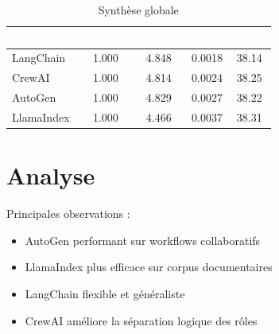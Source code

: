 \documentclass[12pt,a4paper]{article}
\begin{document}
\begin{table}[H]

\centering

\small

\begin{tabular}{lcccc}

\toprule

\rowcolor{primary}
\textcolor{white}{\textbf{Framework}} &
\textcolor{white}{\textbf{Compl.}} &
\textcolor{white}{\textbf{Latence}} &
\textcolor{white}{\textbf{CPU}} &
\textcolor{white}{\textbf{RAM}} \\

\midrule

LangChain & 1.000 & 4.848 & 0.0018 & 38.14 \\

CrewAI & 1.000 & 4.814 & 0.0024 & 38.25 \\

AutoGen & 1.000 & 4.829 & 0.0027 & 38.22 \\

LlamaIndex & 1.000 & 4.466 & 0.0037 & 38.31 \\

\bottomrule

\end{tabular}

\caption{Synthèse globale}

\end{table}


\section{Analyse}

\begin{keypoint}

Principales observations :

\begin{itemize}

\item AutoGen performant sur workflows collaboratifs

\item LlamaIndex plus efficace sur corpus documentaires

\item LangChain flexible et généraliste

\item CrewAI améliore la séparation logique des rôles

\end{itemize}

\end{keypoint}
\end{document}
